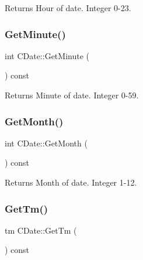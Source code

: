 \begin{DoxyReturn}{Returns}
Hour of date. Integer 0-\/23. 
\end{DoxyReturn}
\mbox{\label{class_c_date_a50240341813279851647f7317b177295}} 
\subsubsection{\texorpdfstring{Get\+Minute()}{GetMinute()}}
{\footnotesize\ttfamily int C\+Date\+::\+Get\+Minute (\begin{DoxyParamCaption}{ }\end{DoxyParamCaption}) const\hspace{0.3cm}{\ttfamily [inline]}}

\begin{DoxyReturn}{Returns}
Minute of date. Integer 0-\/59. 
\end{DoxyReturn}
\mbox{\label{class_c_date_ab35843343ac697ba7ff56c490a3a63aa}} 
\subsubsection{\texorpdfstring{Get\+Month()}{GetMonth()}}
{\footnotesize\ttfamily int C\+Date\+::\+Get\+Month (\begin{DoxyParamCaption}{ }\end{DoxyParamCaption}) const\hspace{0.3cm}{\ttfamily [inline]}}

\begin{DoxyReturn}{Returns}
Month of date. Integer 1-\/12. 
\end{DoxyReturn}
\mbox{\label{class_c_date_aefc467c5b186c0d0c8499e32295eced2}} 
\subsubsection{\texorpdfstring{Get\+Tm()}{GetTm()}}
{\footnotesize\ttfamily tm C\+Date\+::\+Get\+Tm (\begin{DoxyParamCaption}{ }\end{DoxyParamCaption}) const}

